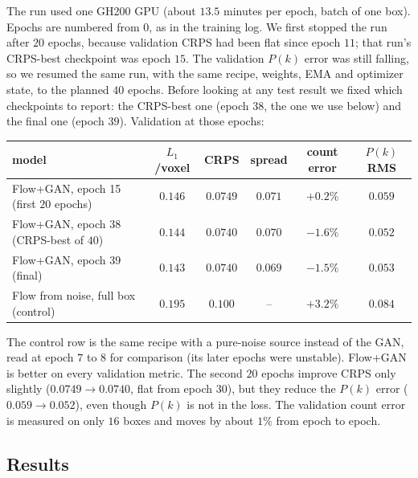 The run used one GH200 GPU (about $13.5$ minutes per epoch, batch of one box).
Epochs are numbered from $0$, as in the training log. We first stopped the run
after $20$ epochs, because validation CRPS had been flat since epoch $11$; that
run's CRPS-best checkpoint was epoch $15$. The validation $P(k)$ error was still
falling, so we resumed the same run, with the same recipe, weights, EMA and optimizer state,
to the planned $40$ epochs. Before looking at any test result we fixed which
checkpoints to report: the CRPS-best one (epoch $38$, the one we use below) and the
final one (epoch $39$). Validation at those epochs:

\begin{center}
\begin{tabular}{lccccc}
\toprule
model & $L_1$/voxel & CRPS & spread & count error & $P(k)$ RMS \\
\midrule
Flow+GAN, epoch 15 (first $20$ epochs) & $0.146$ & $0.0749$ & $0.071$ & $+0.2\%$ & $0.059$ \\
Flow+GAN, epoch 38 (CRPS-best of $40$) & $0.144$ & $\mathbf{0.0740}$ & $0.070$ & $-1.6\%$ & $\mathbf{0.052}$ \\
Flow+GAN, epoch 39 (final) & $0.143$ & $\mathbf{0.0740}$ & $0.069$ & $-1.5\%$ & $0.053$ \\
Flow from noise, full box (control) & $0.195$ & $0.100$ & -- & $+3.2\%$ & $0.084$ \\
\bottomrule
\end{tabular}
\end{center}
The control row is the same recipe with a pure-noise source instead of the GAN,
read at epoch $7$ to $8$ for comparison (its later epochs were unstable). Flow+GAN
is better on every validation metric. The second $20$ epochs improve CRPS only
slightly ($0.0749\to0.0740$, flat from epoch $30$), but they reduce the $P(k)$ error
($0.059\to0.052$), even though $P(k)$ is not in the loss. The validation count error
is measured on only $16$ boxes and moves by about $1\%$ from epoch to epoch.

\subsection{Results}
\label{sec:fg-results}

